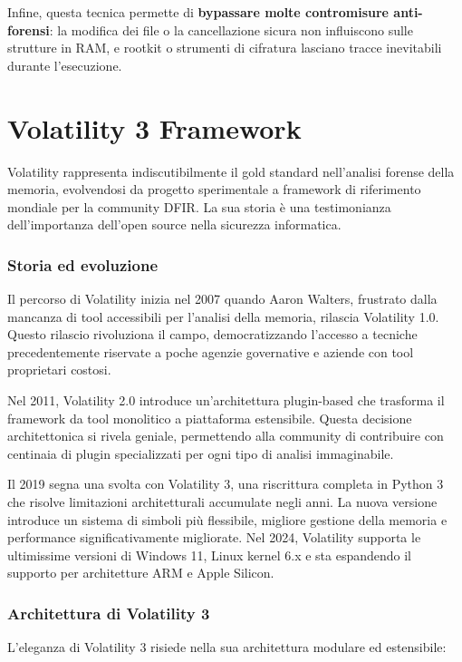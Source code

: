 Infine, questa tecnica permette di \textbf{bypassare molte contromisure anti-forensi}: la modifica dei file o la cancellazione sicura non influiscono sulle strutture in RAM, e rootkit o strumenti di cifratura lasciano tracce inevitabili durante l’esecuzione.

\section{Volatility 3 Framework}

Volatility \cite{volatility2024} rappresenta indiscutibilmente il gold standard nell'analisi forense della memoria, evolvendosi da progetto sperimentale a framework di riferimento mondiale per la community DFIR. La sua storia è una testimonianza dell'importanza dell'open source nella sicurezza informatica.

\subsubsection{Storia ed evoluzione}
Il percorso di Volatility inizia nel 2007 quando Aaron Walters, frustrato dalla mancanza di tool accessibili per l'analisi della memoria, rilascia Volatility 1.0. Questo rilascio rivoluziona il campo, democratizzando l'accesso a tecniche precedentemente riservate a poche agenzie governative e aziende con tool proprietari costosi.

Nel 2011, Volatility 2.0 introduce un'architettura plugin-based che trasforma il framework da tool monolitico a piattaforma estensibile. Questa decisione architettonica si rivela geniale, permettendo alla community di contribuire con centinaia di plugin specializzati per ogni tipo di analisi immaginabile.

Il 2019 segna una svolta con Volatility 3, una riscrittura completa in Python 3 che risolve limitazioni architetturali accumulate negli anni. La nuova versione introduce un sistema di simboli più flessibile, migliore gestione della memoria e performance significativamente migliorate. Nel 2024, Volatility supporta le ultimissime versioni di Windows 11, Linux kernel 6.x e sta espandendo il supporto per architetture ARM e Apple Silicon.

\subsubsection{Architettura di Volatility 3}
L'eleganza di Volatility 3 risiede nella sua architettura modulare ed estensibile:

